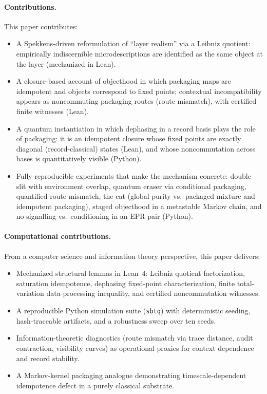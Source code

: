 \paragraph{Contributions.}
This paper contributes:
\begin{itemize}
  \item A Spekkens-driven reformulation of ``layer realism'' via a Leibniz quotient: empirically indiscernible microdescriptions are identified as the same object at the layer (mechanized in Lean).
  \item A closure-based account of objecthood in which packaging maps are idempotent and objects correspond to fixed points; contextual incompatibility appears as noncommuting packaging routes (route mismatch), with certified finite witnesses (Lean).
  \item A quantum instantiation in which dephasing in a record basis plays the role of packaging: it is an idempotent closure whose fixed points are exactly diagonal (record-classical) states (Lean), and whose noncommutation across bases is quantitatively visible (Python).
  \item Fully reproducible experiments that make the mechanism concrete: double slit with environment overlap, quantum eraser via conditional packaging, quantified route mismatch, the cat (global purity vs.\ packaged mixture and idempotent packaging), staged objecthood in a metastable Markov chain, and no-signalling vs.\ conditioning in an EPR pair (Python).
\end{itemize}

\paragraph{Computational contributions.}
From a computer science and information theory perspective, this paper delivers:
\begin{itemize}
  \item Mechanized structural lemmas in Lean~4: Leibniz quotient factorization, saturation idempotence, dephasing fixed-point characterization, finite total-variation data-processing inequality, and certified noncommutation witnesses.
  \item A reproducible Python simulation suite (\texttt{sbtq}) with deterministic seeding, hash-traceable artifacts, and a robustness sweep over ten seeds.
  \item Information-theoretic diagnostics (route mismatch via trace distance, audit contraction, visibility curves) as operational proxies for context dependence and record stability.
  \item A Markov-kernel packaging analogue demonstrating timescale-dependent idempotence defect in a purely classical substrate.
\end{itemize}

